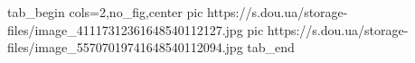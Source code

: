  
 
 
 
 

\ifcmt
  tab_begin cols=2,no_fig,center
     pic https://s.dou.ua/storage-files/image_41117312361648540112127.jpg
		 pic https://s.dou.ua/storage-files/image_55707019741648540112094.jpg
  tab_end
\fi
